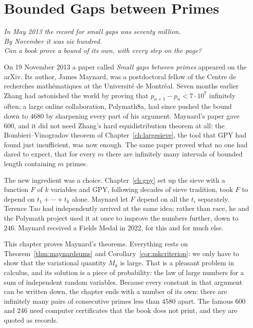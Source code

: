\chapter{Bounded Gaps between Primes}\label{ch:maynard}
\begin{center}\itshape
In May 2013 the record for small gaps was seventy million.\\
By November it was six hundred.\\
Can a book prove a bound of its own, with every step on the page?
\end{center}

On 19 November 2013 a paper called \emph{Small gaps between primes} appeared on the arXiv. Its author, James Maynard, was a postdoctoral fellow of the Centre de recherches mathématiques at the Université de Montréal. Seven months earlier Zhang had astonished the world by proving that $p_{n+1}-p_n<7\cdot10^7$ infinitely often; a large online collaboration, Polymath8a, had since pushed the bound down to $4680$ by sharpening every part of his argument. Maynard's paper gave $600$, and it did not need Zhang's hard equidistribution theorem at all: the Bombieri--Vinogradov theorem of Chapter~\ref{ch:largesieve}, the tool that GPY had found just insufficient, was now enough. The same paper proved what no one had dared to expect, that for every $m$ there are infinitely many intervals of bounded length containing $m$ primes.

The new ingredient was a choice. Chapter~\ref{ch:gpy} set up the sieve with a function $F$ of $k$ variables and GPY, following decades of sieve tradition, took $F$ to depend on $t_1+\cdots+t_k$ alone. Maynard let $F$ depend on all the $t_i$ separately. Terence Tao had independently arrived at the same idea; rather than race, he and the Polymath project used it at once to improve the numbers further, down to $246$. Maynard received a Fields Medal in 2022, for this and for much else.

This chapter proves Maynard's theorems. Everything rests on Theorem~\ref{thm:maynardsums} and Corollary~\ref{cor:mkcriterion}: we only have to show that the variational quantity $M_k$ is large. That is a pleasant problem in calculus, and its solution is a piece of probability: the law of large numbers for a sum of independent random variables. Because every constant in that argument can be written down, the chapter ends with a number of its own: there are infinitely many pairs of consecutive primes less than $4580$ apart. The famous $600$ and $246$ need computer certificates that the book does not print, and they are quoted as records.

